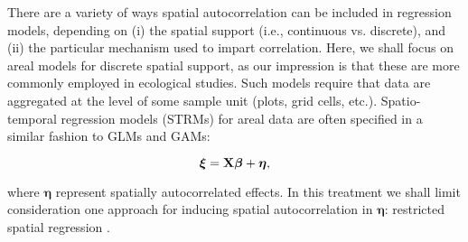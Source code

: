 \documentclass[12pt,fleqn]{article}
\begin{document}
\begin{flushleft}
\hspace{.5in}There are a variety of ways spatial autocorrelation can be included in regression models, depending on (i) the spatial support (i.e., continuous vs. discrete), and (ii) the particular mechanism used to impart correlation.  Here, we shall focus on areal models for discrete spatial support, as our impression is that these are more commonly employed in ecological studies.  Such models require that data are aggregated at the level of some sample unit (plots, grid cells, etc.).  Spatio-temporal regression models (STRMs) for areal data are often specified in a similar fashion to GLMs and GAMs:
\begin{linenomath*}
\begin{equation}
  \label{eq:spat_reg}
  \boldsymbol{\xi}={\bf X} \boldsymbol{\beta} + \boldsymbol{\eta},
\end{equation}
\end{linenomath*}
where $\boldsymbol{\eta}$ represent spatially autocorrelated effects.  In this treatment we shall limit consideration one approach for
inducing spatial autocorrelation in $\boldsymbol{\eta}$: restricted spatial regression \citep[RSR;][]{Reich2006,Hodges2010,Hughes2013}.


\end{flushleft}
\end{document}
